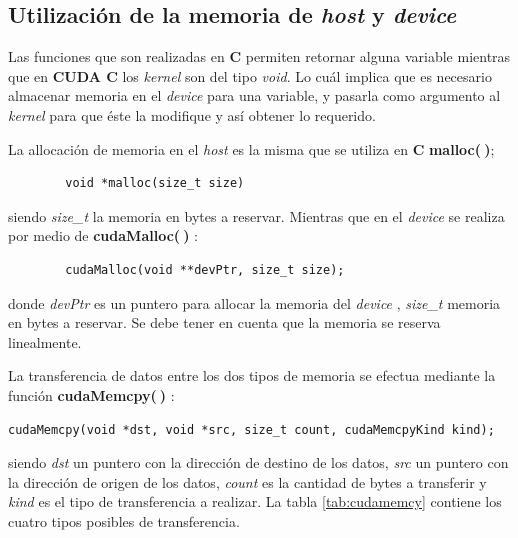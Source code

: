 \subsection{Utilización de la memoria de \textit{host} y \textit{device}}


Las funciones que son realizadas en \textbf{C} permiten retornar alguna variable mientras que en \textbf{CUDA C} los \textit{kernel} son del tipo \textit{void}. Lo cuál implica que es necesario almacenar memoria en el \textit{device} para una variable, y pasarla como argumento al \textit{kernel} para que éste la modifique y así obtener lo requerido. 

La allocación de memoria en el \textit{host} es la misma que se utiliza en \textbf{C}  \textbf{malloc($\>$)};
{\footnotesize
	\begin{frame}{}
		\begin{lstlisting}
		void *malloc(size_t size)
		\end{lstlisting}
		
	\end{frame}
}

siendo \textit{size\_t} la memoria en bytes a reservar. Mientras que en el \textit{device} se realiza por medio de \textbf{cudaMalloc($\>$)} :
{\footnotesize
\begin{frame}{}
	\begin{lstlisting}
		cudaMalloc(void **devPtr, size_t size);
	\end{lstlisting}

\end{frame}
}
donde \textit{devPtr} es un puntero para allocar la memoria del \textit{device} , \textit{size\_t} memoria en bytes a reservar. Se debe tener en cuenta que la memoria se reserva linealmente.

La transferencia de datos entre los dos tipos de memoria se efectua mediante la función \textbf{cudaMemcpy($\>$)} :
{\footnotesize
\begin{frame}{}
	\begin{lstlisting}
cudaMemcpy(void *dst, void *src, size_t count, cudaMemcpyKind kind);
	\end{lstlisting}
	
\end{frame}
}
siendo \textit{dst} un puntero con la dirección de destino de los datos, \textit{src} un puntero con la dirección de origen de los datos, \textit{count} es la cantidad de bytes a transferir y \textit{kind} es el tipo de transferencia a realizar\cite{zone2020cuda}. La tabla \ref{tab:cudamemcy} contiene los cuatro tipos posibles de transferencia.

